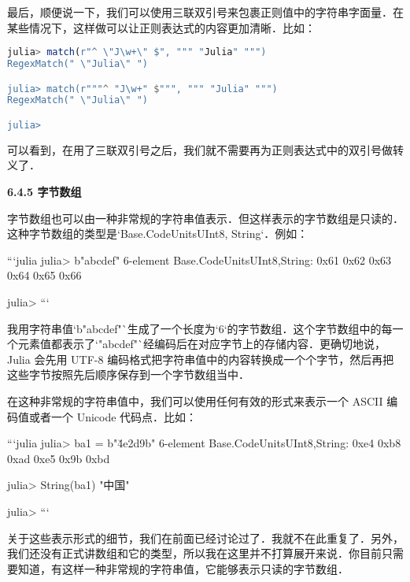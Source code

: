 最后，顺便说一下，我们可以使用三联双引号来包裹正则值中的字符串字面量．在某些情况下，这样做可以让正则表达式的内容更加清晰．比如：
\begin{lstlisting}[language=julia]
julia> match(r"^ \"J\w+\" $", """ "Julia" """)
RegexMatch(" \"Julia\" ")

julia> match(r"""^ "J\w+" $""", """ "Julia" """)
RegexMatch(" \"Julia\" ")

julia> 
\end{lstlisting}

可以看到，在用了三联双引号之后，我们就不需要再为正则表达式中的双引号做转义了．

\textbf{6.4.5 字节数组}

字节数组也可以由一种非常规的字符串值表示．但这样表示的字节数组是只读的．这种字节数组的类型是`Base.CodeUnits{UInt8, String}`．例如：

```julia
julia> b"abcdef"
6-element Base.CodeUnits{UInt8,String}:
 0x61
 0x62
 0x63
 0x64
 0x65
 0x66

julia>
```

我用字符串值`b"abcdef"`生成了一个长度为`6`的字节数组．这个字节数组中的每一个元素值都表示了`"abcdef"`经编码后在对应字节上的存储内容．更确切地说，Julia 会先用 UTF-8 编码格式把字符串值中的内容转换成一个个字节，然后再把这些字节按照先后顺序保存到一个字节数组当中．

在这种非常规的字符串值中，我们可以使用任何有效的形式来表示一个 ASCII 编码值或者一个 Unicode 代码点．比如：

```julia
julia> ba1 = b"\u4e2d\x9b\xbd"
6-element Base.CodeUnits{UInt8,String}:
 0xe4
 0xb8
 0xad
 0xe5
 0x9b
 0xbd

julia> String(ba1)
"中国"

julia>
```

关于这些表示形式的细节，我们在前面已经讨论过了．我就不在此重复了．另外，我们还没有正式讲数组和它的类型，所以我在这里并不打算展开来说．你目前只需要知道，有这样一种非常规的字符串值，它能够表示只读的字节数组．